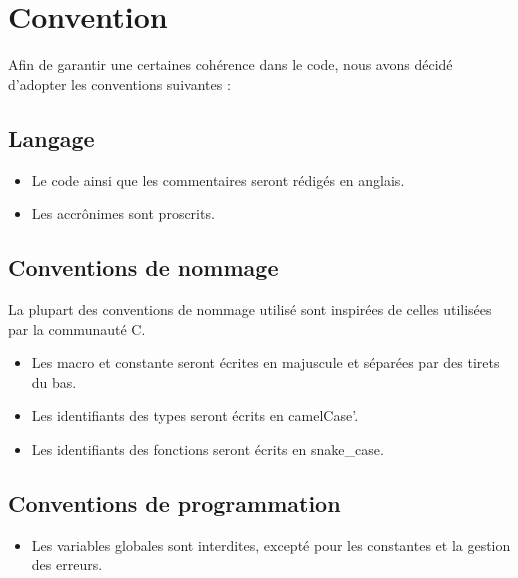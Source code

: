 \section{Convention}

Afin de garantir une certaines cohérence dans le code, nous avons décidé d'adopter les conventions suivantes :

\subsection{Langage}

\begin{itemize}
    \item Le code ainsi que les commentaires seront rédigés en anglais.
    \item Les accrônimes sont proscrits.
\end{itemize}


\subsection{Conventions de nommage}

La plupart des conventions de nommage utilisé sont inspirées de celles utilisées par la communauté C.

\begin{itemize}
    \item Les macro et constante seront écrites en majuscule et séparées par des tirets du bas.
    \item Les identifiants des types seront écrits en camelCase'.
    \item Les identifiants des fonctions seront écrits en snake\_case.
\end{itemize}

\subsection{Conventions de programmation}

\begin{itemize}
    \item Les variables globales sont interdites, excepté pour les constantes et la gestion des erreurs.
\end{itemize}